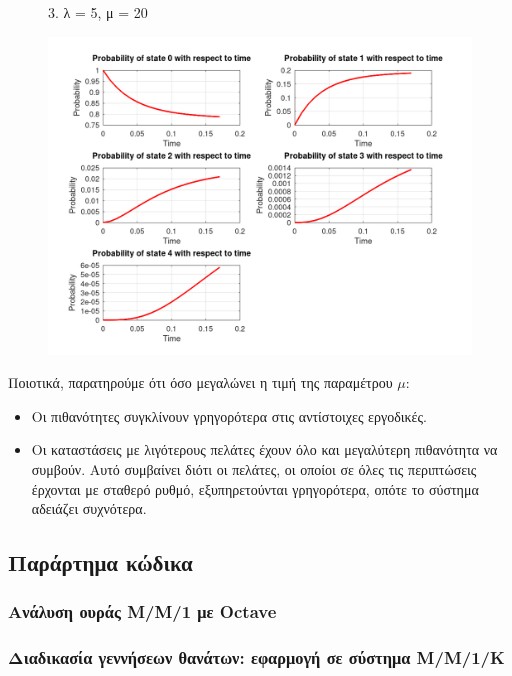 \documentclass[a4paper]{article}
\begin{document}
	
	\begin{figure}[H]
	3. λ = 5, μ = 20
		\begin{center}
			\includegraphics[width=\textwidth]{files/3bvi_3.png}
		\end{center}
	\end{figure}
	
	Ποιοτικά, παρατηρούμε ότι όσο μεγαλώνει η τιμή της παραμέτρου $ μ $:
	\begin{itemize}
		\item Οι πιθανότητες συγκλίνουν γρηγορότερα στις αντίστοιχες εργοδικές.
		\item Οι καταστάσεις με λιγότερους πελάτες έχουν όλο και μεγαλύτερη πιθανότητα να συμβούν. Αυτό συμβαίνει διότι οι πελάτες, οι οποίοι σε όλες τις περιπτώσεις έρχονται με σταθερό ρυθμό, εξυπηρετούνται γρηγορότερα, οπότε το σύστημα αδειάζει συχνότερα. 
	\end{itemize}
	
\subsection*{Παράρτημα κώδικα}

\subsubsection*{Ανάλυση ουράς Μ/Μ/1 με Octave}



\subsubsection*{Διαδικασία γεννήσεων θανάτων: εφαρμογή σε σύστημα Μ/Μ/1/Κ}

	
\end{document}
